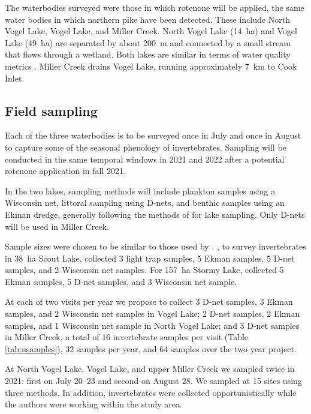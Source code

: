 \begin{multicols}{2}
The waterbodies surveyed were those in which rotenone will be applied, the same water bodies in which northern pike have been detected. These include North Vogel Lake, Vogel Lake, and Miller Creek. North Vogel Lake (14~ha) and Vogel Lake (49~ha) are separated by about 200~m and connected by a small stream that flows through a wetland. Both lakes are similar in terms of water quality metrics \citep{Meyer2021}. Miller Creek drains Vogel Lake, running approximately 7~km to Cook Inlet.

\subsection{Field sampling}

Each of the three waterbodies is to be surveyed once in July and once in August to capture some of the seasonal phenology of invertebrates. Sampling will be conducted in the same temporal windows in 2021 and 2022 after a potential rotenone application in fall 2021.

In the two lakes, sampling methods will include plankton samples using a Wisconsin net, littoral sampling using D-nets, and benthic samples using an Ekman dredge, generally following the methods of \citet{Massengill2014, Massengill2017} for lake sampling. Only D-nets will be used in Miller Creek.

Sample sizes were chosen to be similar to those used by \citet{Massengill2014, Massengill2017}. \citet{Massengill2014}, to survey invertebrates in 38~ha Scout Lake, collected 3 light trap samples, 5 Ekman samples, 5 D-net samples, and 2 Wisconsin net samples. For 157~ha Stormy Lake, \citet{Massengill2014, Massengill2017} collected 5 Ekman samples, 5 D-net samples, and 3 Wisconsin net sample.

At each of two visits per year we propose to collect 3 D-net samples, 3 Ekman samples, and 2 Wisconsin net samples in Vogel Lake; 2 D-net samples, 2 Ekman samples, and 1 Wisconsin net sample in North Vogel Lake; and 3 D-net samples in Miller Creek, a total of 16 invertebrate samples per visit (Table \ref{tab:nsamples}), 32 samples per year, and 64 samples over the two year project. 



At North Vogel Lake, Vogel Lake, and upper Miller Creek we sampled twice in 2021: first on July 20--23 and second on August 28. We sampled at 15 sites using three methods. In addition, invertebrates were collected opportunistically while the authors were working within the study area. 


\end{multicols}
